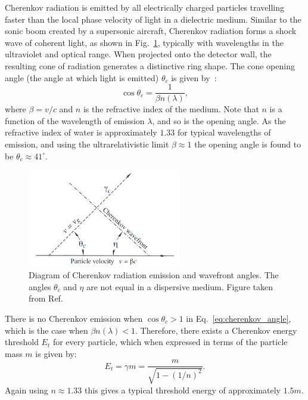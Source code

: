 Cherenkov radiation is emitted by all electrically charged particles travelling faster than the
local phase velocity of light in a dielectric medium. Similar to the sonic boom created by a
supersonic aircraft, Cherenkov radiation forms a shock wave of coherent light, as shown in
Fig.~\ref{fig:cherenkov}, typically with wavelengths in the ultraviolet and optical range. When
projected onto the detector wall, the resulting cone of radiation generates a distinctive ring
shape. The cone opening angle (the angle at which light is emitted) $\theta_{c}$ is given
by~\cite{particle2020}:
\begin{equation}
    \cos\theta_{c} = \frac{1}{\beta n(\lambda)},
    \label{eq:cherenkov_angle}
\end{equation}
where $\beta=v/c$ and $n$ is the refractive index of the medium. Note that $n$ is a function of
the wavelength of emission $\lambda$, and so is the opening angle. As the refractive index of
water is approximately $1.33$ for typical wavelengths of emission, and using the ultrarelativistic
limit $\beta\approx 1$ the opening angle is found to be $\theta_{c}\approx 41^{\circ}$.

\begin{figure} %
    \includegraphics[width=0.6\textwidth]{diagrams/4-chips/cherenkov.png}
    \caption[Diagram of Cherenkov radiation emission.]
    {Diagram of Cherenkov radiation emission and wavefront angles. The angles $\theta_{c}$ and
        $\eta$ are not equal in a dispersive medium. Figure taken from Ref.~\cite{particle2020}}
    \label{fig:cherenkov}
\end{figure}

There is no Cherenkov emission when $\cos\theta_{c} > 1$ in Eq.~\ref{eq:cherenkov_angle}, which is
the case when $\beta n(\lambda)<1$. Therefore, there exists a Cherenkov energy threshold $E_{t}$
for every particle, which when expressed in terms of the particle mass $m$ is given by:
\begin{equation}
    E_{t} = \gamma m = \frac{m}{\sqrt{1-(1/n)^{2}}}.
    \label{eq:cherenkov_threshold}
\end{equation}
Again using $n\approx1.33$ this gives a typical threshold energy of approximately $1.5m$.

